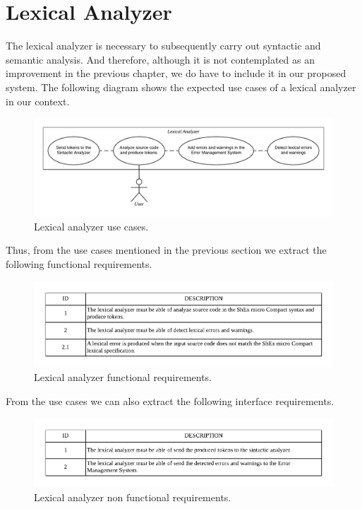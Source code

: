 \section{Lexical Analyzer}
The lexical analyzer is necessary to subsequently carry out syntactic and semantic analysis.
And therefore, although it is not contemplated as an improvement in
the previous chapter, we do have to include it in our proposed system. The following diagram
shows the expected use cases of a lexical analyzer in our context.

\begin{figure}[h!]
    \includegraphics[scale=0.6]{images/lex-use-case.pdf}
    \centering
    \caption[Lexical analyzer use cases]{Lexical analyzer use cases.}
    \label{fig:lex-use-case}
\end{figure}

Thus, from the use cases mentioned in the previous section we
extract the following functional requirements.

\begin{figure}[h!]
    \includegraphics[width=\textwidth]{images/lex-reqf.pdf}
    \centering
    \caption[Lexical analyzer functional requirements]{Lexical analyzer functional requirements.}
    \label{fig:lex-reqf}
\end{figure}

From the use cases we can also extract the following interface requirements.

\begin{figure}[h!]
    \includegraphics[width=\textwidth]{images/lex-reqnf.pdf}
    \centering
    \caption[Lexical analyzer non functional requirements]{Lexical analyzer non functional requirements.}
    \label{fig:lex-reqnf}
\end{figure}

